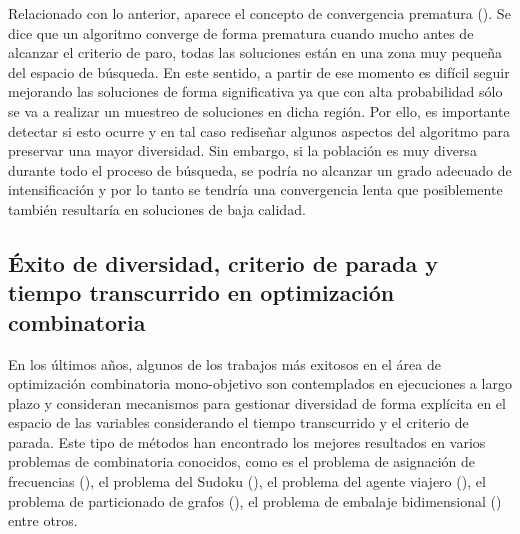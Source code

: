 Relacionado con lo anterior, aparece el concepto de convergencia prematura (\cite{Crepinsek:13}).
%
Se dice que un algoritmo converge de forma prematura cuando mucho antes de alcanzar el criterio de paro, todas las soluciones están en una zona muy pequeña del espacio de búsqueda.
%
En este sentido, a partir de ese momento es difícil seguir mejorando las soluciones de forma significativa ya que con alta probabilidad sólo se va a realizar un muestreo de soluciones en dicha región.
%
Por ello, es importante detectar si esto ocurre y en tal caso rediseñar algunos aspectos del algoritmo para preservar una mayor diversidad.
%
Sin embargo, si la población es muy diversa durante todo el proceso de búsqueda, se podría no alcanzar un grado adecuado de intensificación y por lo tanto se tendría una convergencia lenta que posiblemente también resultaría en soluciones de baja calidad.

\subsection{Éxito de diversidad, criterio de parada y tiempo transcurrido en optimización combinatoria}

En los últimos años, algunos de los trabajos más exitosos en el área de optimización combinatoria mono-objetivo son contemplados en ejecuciones a largo plazo y consideran mecanismos para gestionar diversidad de forma explícita en el espacio de las variables considerando el tiempo transcurrido y el criterio de parada.
%
Este tipo de métodos han encontrado los mejores resultados en varios problemas de combinatoria conocidos, como es el problema de asignación de frecuencias  (\cite{Joel:Dynamic_FAP}), el problema del Sudoku  (\cite{Joel:Dynamic_Sudoku}), el problema del agente viajero  (\cite{Joel:ANovelDiversityBasedEAForTheTSP}), el problema de particionado de grafos  (\cite{romero2018memetic}), el problema de embalaje bidimensional  (\cite{segredo2014memetic})  entre otros.

%
%
%



